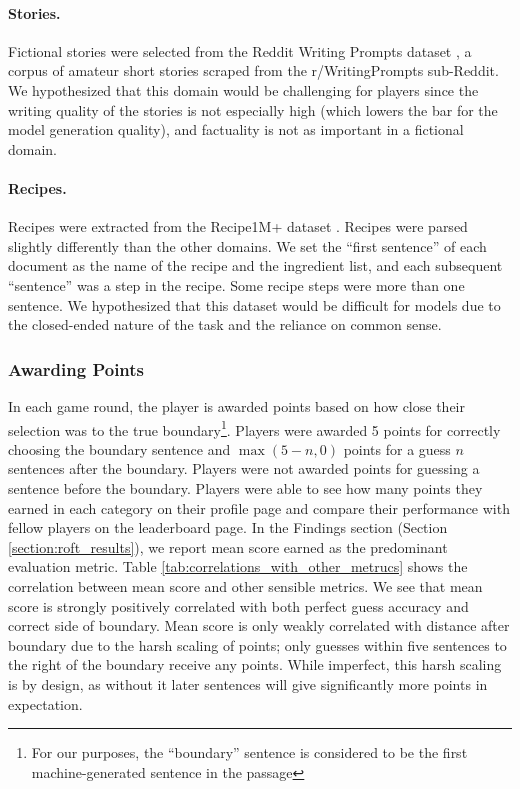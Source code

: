 \paragraph{Stories.}
Fictional stories were selected from the Reddit Writing Prompts dataset \citep{fan2018hierarchical}, a corpus of amateur short stories scraped from the r/WritingPrompts sub-Reddit.
We hypothesized that this domain would be challenging for players since the writing quality of the stories is not especially high (which lowers the bar for the model generation quality), and factuality is not as important in a fictional domain.

\paragraph{Recipes.}
Recipes were extracted from the Recipe1M+ dataset \cite{marin2019learning}.
Recipes were parsed slightly differently than the other domains.
We set the ``first sentence'' of each document as the name of the recipe and the ingredient list, and each subsequent ``sentence'' was a step in the recipe. Some recipe steps were more than one sentence. We hypothesized that this dataset would be difficult for models due to the closed-ended nature of the task and the reliance on common sense. 

\subsubsection{Awarding Points}
\label{sec:points}
In each game round, the player is awarded points based on how close their selection was to the true boundary\footnote{For our purposes, the ``boundary'' sentence is considered to be the first machine-generated sentence in the passage}.
Players were awarded 5 points for correctly choosing the boundary sentence and $\max(5-n, 0)$ points for a guess $n$ sentences after the boundary.
Players were not awarded points for guessing a sentence before the boundary.
Players were able to see how many points they earned in each category on their profile page and compare their performance with fellow players on the leaderboard page.
In the Findings section (Section \ref{section:roft_results}), we report mean score earned as the predominant evaluation metric. 
Table \ref{tab:correlations_with_other_metrucs} shows the correlation between mean score and other sensible metrics.
We see that mean score is strongly positively correlated with both perfect guess accuracy and correct side of boundary. Mean score is only weakly correlated with distance after boundary due to the harsh scaling of points; only guesses within five sentences to the right of the boundary receive any points. While imperfect, this harsh scaling is by design, as without it later sentences will give significantly more points in expectation.

